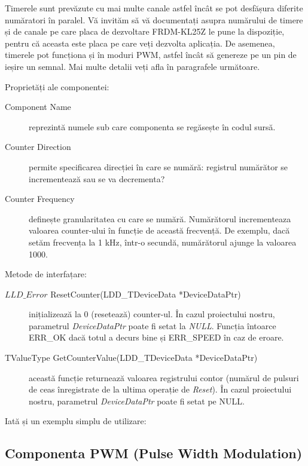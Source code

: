 Timerele sunt prevăzute cu mai multe canale astfel încât se pot desfășura diferite număratori în paralel. Vă invităm să vă documentați asupra numărului de timere și de canale pe care placa de dezvoltare FRDM-KL25Z le pune la dispoziție, pentru că aceasta este placa pe care veți dezvolta aplicația. De asemenea, timerele pot funcționa și în moduri PWM, astfel încât să genereze pe un pin de ieșire un semnal. Mai multe detalii veți afla în paragrafele următoare.

Proprietăți ale componentei:

\begin{description}
    \item[Component Name] reprezintă numele sub care componenta se regăsește în codul sursă.
    \item[Counter Direction] permite specificarea direcției în care se numără: registrul numărător se incrementează sau se va decrementa?
    \item[Counter Frequency] definește granularitatea cu care se numără. Numărătorul incrementeaza valoarea counter-ului în funcție de această frecvență. De exemplu, dacă setăm frecvența la 1 kHz, într-o secundă, numărătorul ajunge la valoarea 1000. 
\end{description}

Metode de interfațare:

\begin{description}
    \item[$LLD\_Error$ ResetCounter(LDD\_TDeviceData *DeviceDataPtr)] inițializează la 0 (resetează) counter-ul. În cazul proiectului nostru, parametrul \textit{DeviceDataPtr} poate fi setat la \textit{NULL}. Funcția întoarce ERR\_OK dacă totul a decurs bine și ERR\_SPEED în caz de eroare. 
    \item[TValueType GetCounterValue(LDD\_TDeviceData *DeviceDataPtr)] această funcție returnează valoarea registrului contor (numărul de pulsuri de ceas înregistrate de la ultima operație de \textit{Reset}). În cazul proiectului nostru, parametrul \textit{DeviceDataPtr} poate fi setat pe NULL.
\end{description}

Iată și un exemplu simplu de utilizare:



\subsection{Componenta PWM (Pulse Width Modulation)}

